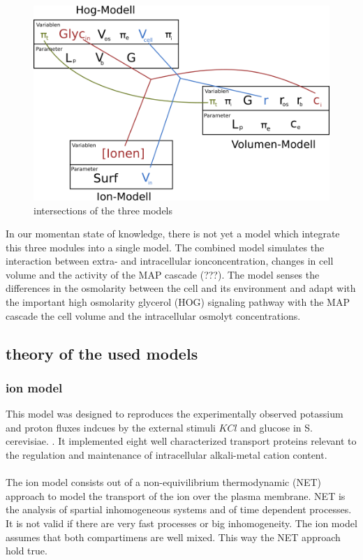 \begin{figure}[h!]
	\begin{center}
		\begin{minipage}{0,8\textwidth}
			
			\includegraphics[width=\textwidth]{picture/model_intersections.png}
			\caption{intersections of the three models } 
			\label{IntersectionsOfTheModels} 
		\end{minipage}
	\end{center}
\end{figure}

In our momentan state of knowledge, there is not yet a model which integrate this three modules into a single model. The combined model simulates the interaction between extra- and intracellular ionconcentration, changes in cell volume and the activity of the MAP cascade (???). The model senses the differences in the osmolarity between the cell and its environment and adapt with the important high osmolarity glycerol (HOG) signaling pathway with the MAP cascade the cell volume and the intracellular osmolyt concentrations. 

\subsection{theory of the used models}
\subsubsection{ion model}
This model was designed to reproduces the experimentally observed potassium and proton fluxes indcues by the external stimuli $KCl$ and glucose in S. cerevisiae. . It implemented eight well characterized transport proteins relevant to the regulation and maintenance of intracellular alkali-metal cation content. \cite{Gerber_2016}\\\\
The ion model consists out of a non-equivilibrium thermodynamic (NET) approach to model the transport of the ion over the plasma membrane. NET is the analysis of spartial inhomogeneous systems and of time dependent processes. It is not valid if there are very fast processes or big inhomogeneity. The ion model assumes that both compartimens are well mixed. This way the NET approach hold true. \\

